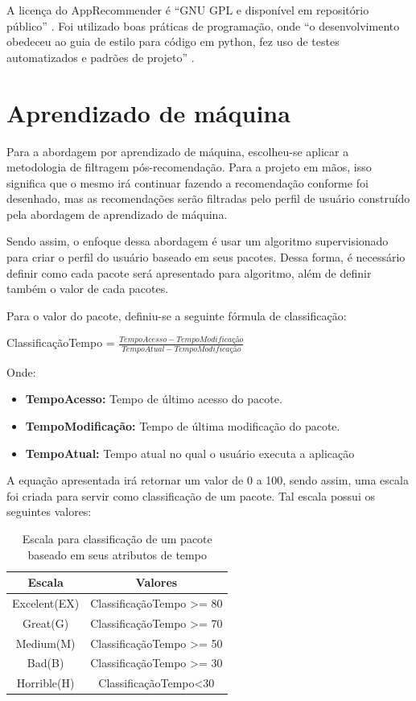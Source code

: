 A licença do AppRecommender é “GNU GPL e disponível em repositório público” \cite{araujo2011apprecommender}.
Foi utilizado boas práticas de programação, onde “o desenvolvimento obedeceu ao guia
de estilo para código em python, fez uso de testes automatizados e padrões de
projeto” \cite{araujo2011apprecommender}.


\section{Aprendizado de máquina}

Para a abordagem por aprendizado de máquina, escolheu-se aplicar a
metodologia de filtragem pós-recomendação. Para a projeto em mãos, isso
significa que o mesmo irá continuar fazendo a recomendação conforme foi
desenhado, mas as recomendações serão filtradas pelo perfil de usuário
construído pela abordagem de aprendizado de máquina.

Sendo assim, o enfoque dessa abordagem é usar um algoritmo supervisionado
para criar o perfil do usuário baseado em seus pacotes. Dessa forma, é
necessário definir como cada pacote será apresentado para algoritmo, além de
definir também o valor de cada pacotes.

Para o valor do pacote, definiu-se a seguinte fórmula de classificação:

ClassificaçãoTempo = $\frac{TempoAcesso - TempoModificação}{TempoAtual -
TempoModificação}$


Onde:

\begin{itemize}
    \item \textbf{TempoAcesso:} Tempo de último acesso do pacote.
    \item \textbf{TempoModificação:} Tempo de última modificação do pacote.
    \item \textbf{TempoAtual:} Tempo atual no qual o usuário executa a
        aplicação
\end{itemize}


A equação apresentada irá retornar um valor de 0 a 100, sendo assim, uma
escala foi criada para servir como classificação de um pacote. Tal escala
possui os seguintes valores:

\begin{table}[h]
\centering
\begin{tabular}{cc}
\hline
\rowcolor[HTML]{EFEFEF}
{Escala} & {Valores} \\ \hline
{Excelent(EX)}  & ClassificaçãoTempo >= 80                  \\ \hline
{Great(G)}   & ClassificaçãoTempo >= 70                  \\ \hline
{Medium(M)}   & ClassificaçãoTempo >= 50                  \\ \hline
{Bad(B)}   & ClassificaçãoTempo >= 30                  \\ \hline
{Horrible(H)}   &ClassificaçãoTempo<30                   \\ \hline
\end{tabular}
\caption{Escala para classificação de um pacote baseado em seus atributos de tempo}
\label{tab:cwe476-erros}
\end{table}


